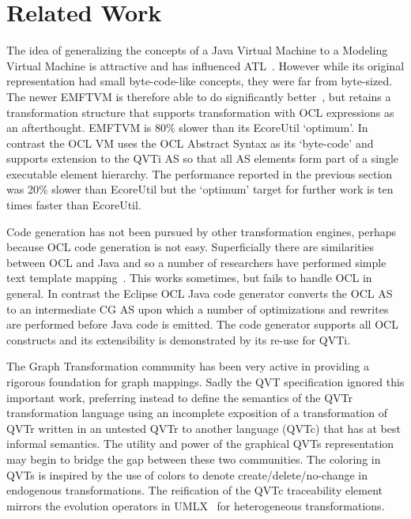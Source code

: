 \documentclass{llncs}
\begin{document}
\section{Related Work}\label{Related Work}

The idea of generalizing the concepts of a Java Virtual Machine to a Modeling Virtual Machine is attractive and has influenced ATL~\cite{Eclipse-ATL}. However while its original representation had small byte-code-like concepts, they were far from byte-sized. The newer EMFTVM  is therefore able to do significantly better~\cite{EMFTVM-performance}, but retains a transformation structure that supports transformation with OCL expressions as an afterthought. EMFTVM is 80\% slower than its EcoreUtil `optimum'. In contrast the OCL VM uses the OCL Abstract Syntax as its `byte-code' and supports extension to the QVTi AS so that all AS elements form part of a single executable element hierarchy. The performance reported in the previous section was 20\% slower than EcoreUtil but the `optimum' target for further work is ten times faster than EcoreUtil. 

Code generation has not been pursued by other transformation engines, perhaps because OCL code generation is not easy. Superficially there are similarities between OCL and Java and so a number of researchers have performed simple text template mapping~\cite{Wilke-CG}. This works sometimes, but fails to handle OCL in general. In contrast the Eclipse OCL Java code generator converts the OCL AS to an intermediate CG AS upon which a number of optimizations and rewrites are performed before Java code is emitted. The code generator supports all OCL constructs and its extensibility is demonstrated by its re-use for QVTi.

The Graph Transformation community has been very active in providing a rigorous foundation for graph mappings. Sadly the QVT specification ignored this important work, preferring instead to define the semantics of the QVTr transformation language using an incomplete exposition of a transformation of QVTr written in an untested QVTr to another language (QVTc) that has at best informal semantics. The utility and power of the graphical QVTs representation may begin to bridge the gap between these two communities. The coloring in QVTs is inspired by the use of colors to denote create/delete/no-change in endogenous transformations. The reification of the QVTc traceability element mirrors the evolution operators in UMLX~\cite{UMLX} for heterogeneous transformations.
\end{document}
